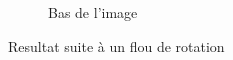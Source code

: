 \documentclass[a4paper,10pt]{report}
\begin{document}
\begin{figure}[h]
\begin{subfigure}{0.32\textwidth}
\caption{Bas de l'image}
\label{fig:flouRotBottom}
\end{subfigure}


\caption{Resultat suite à un flou de rotation}
\label{fig:rotation}
\end{figure}
\end{document}
